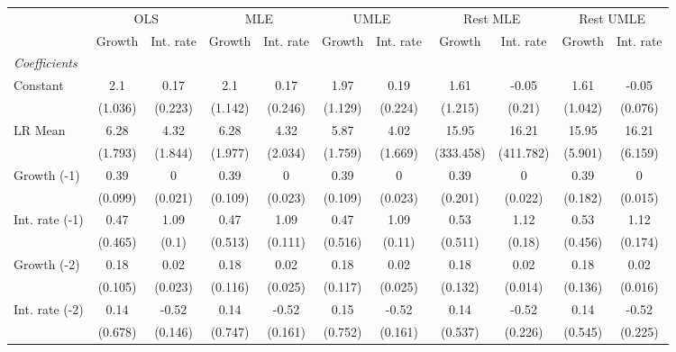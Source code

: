 \begin{table}[htbp] 
	\centering
	\begin{tabular}{@{\extracolsep{4pt}}lcccccccccc@{}}		\hline\hline
		 		 & \multicolumn{2}{c}{OLS} &\multicolumn{2}{c}{MLE} &\multicolumn{2}{c}{UMLE} &\multicolumn{2}{c}{Rest MLE} &\multicolumn{2}{c}{Rest UMLE} \\ 
 		 & Growth 	 & Int. rate 	 & Growth 	 & Int. rate 	 & Growth 	 & Int. rate 	 & Growth 	 & Int. rate 	 & Growth 	 & Int. rate\\\cline{2-3}\cline{4-5}\cline{6-7}\cline{8-9}\cline{10-11}
\rule{0pt}{4ex} 
 \emph{Coefficients} 	  		 & 		 & 		 & 		 & 		 & 		 & 		 & 		 & 		 & 		 &\\ 
\quad Constant 	 & 2.1 	 & 0.17 	 & 2.1 	 & 0.17 	 & 1.97 	 & 0.19 	 & 1.61 	 & -0.05 	 & 1.61 	 & -0.05	 \\ 
 		 & (1.036) 	 & (0.223) 	 & (1.142) 	 & (0.246) 	 & (1.129) 	 & (0.224) 	 & (1.215) 	 & (0.21) 	 & (1.042) 	 & (0.076) 	 \\ 
\quad LR Mean 	 & 6.28 	 & 4.32 	 & 6.28 	 & 4.32 	 & 5.87 	 & 4.02 	 & 15.95 	 & 16.21 	 & 15.95 	 & 16.21	 \\ 
 		 & (1.793) 	 & (1.844) 	 & (1.977) 	 & (2.034) 	 & (1.759) 	 & (1.669) 	 & (333.458) 	 & (411.782) 	 & (5.901) 	 & (6.159) 	 \\ 
\quad Growth (-1) 	 &0.39 	 & 0 	 & 0.39 	 & 0 	 & 0.39 	 & 0 	 & 0.39 	 & 0 	 & 0.39 	 & 0	 \\ 
 		 & (0.099) 	 & (0.021) 	 & (0.109) 	 & (0.023) 	 & (0.109) 	 & (0.023) 	 & (0.201) 	 & (0.022) 	 & (0.182) 	 & (0.015) 	 \\ 
\quad Int. rate (-1) 	 &0.47 	 & 1.09 	 & 0.47 	 & 1.09 	 & 0.47 	 & 1.09 	 & 0.53 	 & 1.12 	 & 0.53 	 & 1.12	 \\ 
 		 & (0.465) 	 & (0.1) 	 & (0.513) 	 & (0.111) 	 & (0.516) 	 & (0.11) 	 & (0.511) 	 & (0.18) 	 & (0.456) 	 & (0.174) 	 \\ 
\quad Growth (-2) 	 &0.18 	 & 0.02 	 & 0.18 	 & 0.02 	 & 0.18 	 & 0.02 	 & 0.18 	 & 0.02 	 & 0.18 	 & 0.02	 \\ 
 		 & (0.105) 	 & (0.023) 	 & (0.116) 	 & (0.025) 	 & (0.117) 	 & (0.025) 	 & (0.132) 	 & (0.014) 	 & (0.136) 	 & (0.016) 	 \\ 
\quad Int. rate (-2) 	 &0.14 	 & -0.52 	 & 0.14 	 & -0.52 	 & 0.15 	 & -0.52 	 & 0.14 	 & -0.52 	 & 0.14 	 & -0.52	 \\ 
 		 & (0.678) 	 & (0.146) 	 & (0.747) 	 & (0.161) 	 & (0.752) 	 & (0.161) 	 & (0.537) 	 & (0.226) 	 & (0.545) 	 & (0.225) 	 \\ 

\end{tabular}
\end{table}
